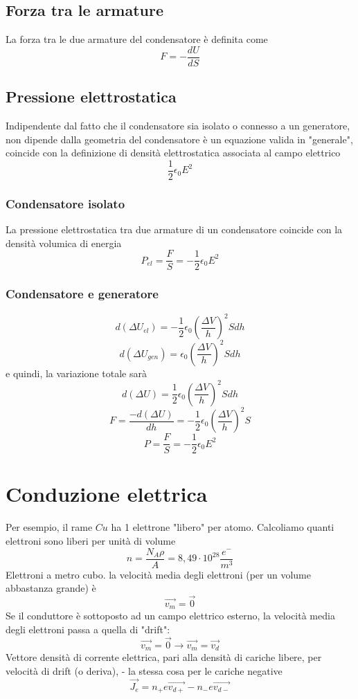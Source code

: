 \documentclass[a4paper]{report}
\begin{document}
  \subsection{Forza tra le armature}
  La forza tra le due armature del condensatore è definita come
  \[ F = -\frac{dU}{dS} \]

  \subsection{Pressione elettrostatica}
  Indipendente dal fatto che il condensatore sia isolato o connesso a un generatore, non dipende dalla geometria del condensatore è un equazione valida in "generale", coincide con la definizione di densità elettrostatica associata al campo elettrico
  \[ \frac{1}{2} \epsilon_0 E^2 \]

  \subsubsection{Condensatore isolato}
  La pressione elettrostatica tra due armature di un condensatore coincide con la densità volumica di energia
  \[ P_{el} = \frac{F}{S} = -\frac{1}{2} \epsilon_0 E^2 \]

  \subsubsection{Condensatore e generatore}
  \[ d(\Delta U_{el}) = -\frac{1}{2} \epsilon_0 (\frac{\Delta V}{h})^2 S dh \]
  \[ d(\Delta U_{gen}) = \epsilon_0 (\frac{\Delta V}{h})^2 S dh \]
  e quindi, la variazione totale sarà
  \[ d(\Delta U) =\frac{1}{2} \epsilon_0 (\frac{\Delta V}{h})^2 S dh \]
  \[ F = \frac{-d(\Delta U)}{dh} = -\frac{1}{2} \epsilon_0 (\frac{\Delta V}{h})^2 S \]
  \[ P = \frac{F}{S} = -\frac{1}{2} \epsilon_0 E^2 \]

  \section{Conduzione elettrica}
  Per esempio, il rame $Cu$ ha 1 elettrone "libero" per atomo. Calcoliamo quanti elettroni sono liberi per unità di volume
  \[ n = \frac{N_A \rho}{ A} = 8,49 \cdot 10^{28} \frac{e^-}{m^3} \]
  Elettroni a metro cubo. la velocità media degli elettroni (per un volume abbastanza grande) è
  \[\vec{v_m} = \vec{0}\]
  Se il conduttore è sottoposto ad un campo elettrico esterno, la velocità media degli elettroni passa a quella di "drift":
  \[ \vec{v_m} = \vec{0} \longrightarrow \vec{v_m} = \vec{v_d} \]
  Vettore densità di corrente elettrica, pari alla densità di cariche libere, per velocità di drift (o deriva), - la stessa cosa per le cariche negative
  \[ \vec{J_e} = n_+ e \vec{v_{d+}} - n_- e \vec{v_{d-}}\]
\end{document}
